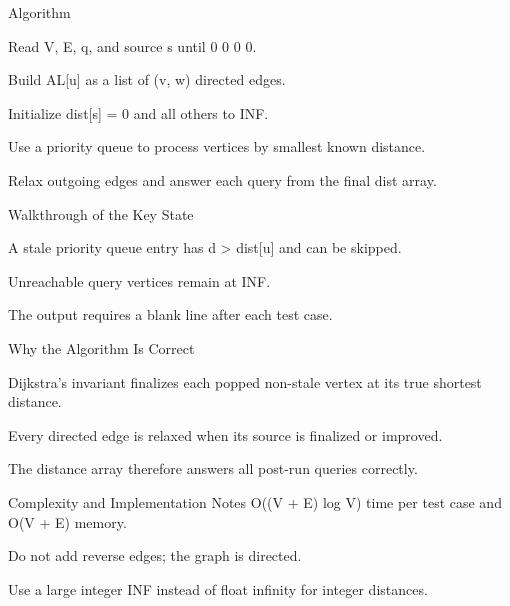 \documentclass[aspectratio=169,11pt]{beamer}
\begin{document}
\begin{frame}{Algorithm}
\begin{tightitemize}
  \item Read V, E, q, and source s until 0 0 0 0.
  \item Build AL[u] as a list of (v, w) directed edges.
  \item Initialize dist[s] = 0 and all others to INF.
  \item Use a priority queue to process vertices by smallest known distance.
  \item Relax outgoing edges and answer each query from the final dist array.
\end{tightitemize}
\end{frame}

\begin{frame}{Walkthrough of the Key State}
\begin{tightitemize}
  \item A stale priority queue entry has d > dist[u] and can be skipped.
  \item Unreachable query vertices remain at INF.
  \item The output requires a blank line after each test case.
\end{tightitemize}
\end{frame}

\begin{frame}{Why the Algorithm Is Correct}
\begin{tightitemize}
  \item Dijkstra's invariant finalizes each popped non-stale vertex at its true shortest distance.
  \item Every directed edge is relaxed when its source is finalized or improved.
  \item The distance array therefore answers all post-run queries correctly.
\end{tightitemize}
\end{frame}

\begin{frame}{Complexity and Implementation Notes}
\small
{} O((V + E) log V) time per test case and O(V + E) memory.

\vspace{0.3cm}
\begin{tightitemize}
  \item Do not add reverse edges; the graph is directed.
  \item Use a large integer INF instead of float infinity for integer distances.
\end{tightitemize}
\end{frame}
\end{document}
